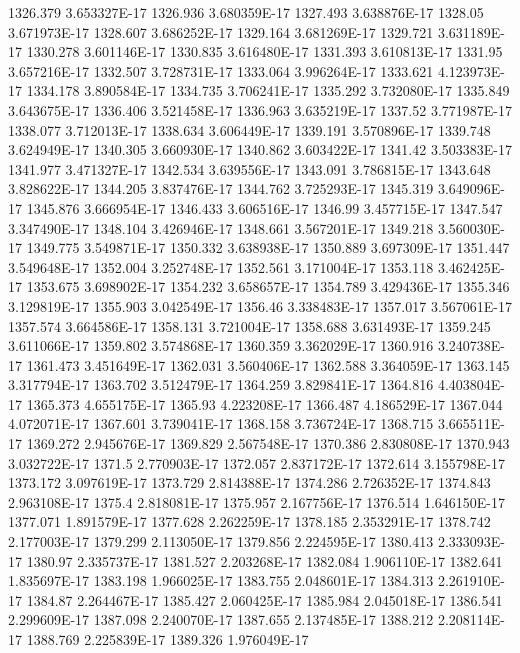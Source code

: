 1326.379  3.653327E-17
1326.936  3.680359E-17
1327.493  3.638876E-17
1328.05  3.671973E-17
1328.607  3.686252E-17
1329.164  3.681269E-17
1329.721  3.631189E-17
1330.278  3.601146E-17
1330.835  3.616480E-17
1331.393  3.610813E-17
1331.95  3.657216E-17
1332.507  3.728731E-17
1333.064  3.996264E-17
1333.621  4.123973E-17
1334.178  3.890584E-17
1334.735  3.706241E-17
1335.292  3.732080E-17
1335.849  3.643675E-17
1336.406  3.521458E-17
1336.963  3.635219E-17
1337.52  3.771987E-17
1338.077  3.712013E-17
1338.634  3.606449E-17
1339.191  3.570896E-17
1339.748  3.624949E-17
1340.305  3.660930E-17
1340.862  3.603422E-17
1341.42  3.503383E-17
1341.977  3.471327E-17
1342.534  3.639556E-17
1343.091  3.786815E-17
1343.648  3.828622E-17
1344.205  3.837476E-17
1344.762  3.725293E-17
1345.319  3.649096E-17
1345.876  3.666954E-17
1346.433  3.606516E-17
1346.99  3.457715E-17
1347.547  3.347490E-17
1348.104  3.426946E-17
1348.661  3.567201E-17
1349.218  3.560030E-17
1349.775  3.549871E-17
1350.332  3.638938E-17
1350.889  3.697309E-17
1351.447  3.549648E-17
1352.004  3.252748E-17
1352.561  3.171004E-17
1353.118  3.462425E-17
1353.675  3.698902E-17
1354.232  3.658657E-17
1354.789  3.429436E-17
1355.346  3.129819E-17
1355.903  3.042549E-17
1356.46  3.338483E-17
1357.017  3.567061E-17
1357.574  3.664586E-17
1358.131  3.721004E-17
1358.688  3.631493E-17
1359.245  3.611066E-17
1359.802  3.574868E-17
1360.359  3.362029E-17
1360.916  3.240738E-17
1361.473  3.451649E-17
1362.031  3.560406E-17
1362.588  3.364059E-17
1363.145  3.317794E-17
1363.702  3.512479E-17
1364.259  3.829841E-17
1364.816  4.403804E-17
1365.373  4.655175E-17
1365.93  4.223208E-17
1366.487  4.186529E-17
1367.044  4.072071E-17
1367.601  3.739041E-17
1368.158  3.736724E-17
1368.715  3.665511E-17
1369.272  2.945676E-17
1369.829  2.567548E-17
1370.386  2.830808E-17
1370.943  3.032722E-17
1371.5  2.770903E-17
1372.057  2.837172E-17
1372.614  3.155798E-17
1373.172  3.097619E-17
1373.729  2.814388E-17
1374.286  2.726352E-17
1374.843  2.963108E-17
1375.4  2.818081E-17
1375.957  2.167756E-17
1376.514  1.646150E-17
1377.071  1.891579E-17
1377.628  2.262259E-17
1378.185  2.353291E-17
1378.742  2.177003E-17
1379.299  2.113050E-17
1379.856  2.224595E-17
1380.413  2.333093E-17
1380.97  2.335737E-17
1381.527  2.203268E-17
1382.084  1.906110E-17
1382.641  1.835697E-17
1383.198  1.966025E-17
1383.755  2.048601E-17
1384.313  2.261910E-17
1384.87  2.264467E-17
1385.427  2.060425E-17
1385.984  2.045018E-17
1386.541  2.299609E-17
1387.098  2.240070E-17
1387.655  2.137485E-17
1388.212  2.208114E-17
1388.769  2.225839E-17
1389.326  1.976049E-17
